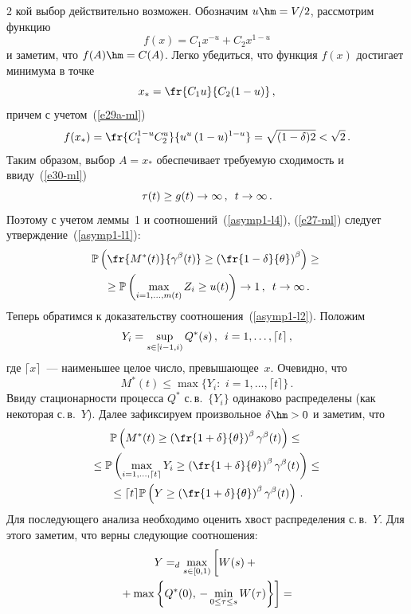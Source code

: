 \begin{multicols}{2}
\noindent
кой выбор  действительно возможен. Обозначим
$u\hm=V/2$, рассмотрим функцию
\begin{equation*}
f(x)=C_1 x^{-u}+C_2 x^{1-u} %
\end{equation*}
и заметим, что $f(A)\hm=C(A)$. Легко убедиться, что функция $f(x)$
достигает минимума в точке
$$
x_*=\fr{C_1 u}{C_2(1-u)}\,,
$$
причем с учетом~(\ref{e29a-ml})
$$
f(x_*)=\fr{C_1^{1-u}C_2^u}{u^u\,(1-u)^{1-u}}=\sqrt{(1-\delta)2}<\sqrt{2}\,.
$$
Таким образом, выбор $A=x_*$ обеспечивает требуемую сходимость и
 ввиду~(\ref{e30-ml})
$$
\tau(t)\ge g(t) \to \infty\,,\enskip t \to \infty\,.
$$
Поэтому с учетом леммы~1 и соотношений~(\ref{asymp1-l4}), (\ref{e27-ml}) следует 
утверждение~(\ref{asymp1-l1}):
\begin{multline*}
\mathbb{P}\left(\fr{M^*(t)}{\gamma^\beta(t)} \geq
 \left(
\fr{1-\delta}{\theta} \right)^\beta \right)\geq{}\\
{}\geq \mathbb{P}\left(
\max\limits_{i=1,\ldots,m(t)}Z_i \geq u(t) \right) \to 1\,,\enskip t \to \infty\,.
\end{multline*}
Теперь обратимся к доказательству соотношения~(\ref{asymp1-l2}).
Положим
$$
Y_i=\sup\limits_{s \in [i-1,i)} Q^*(s)\,,\enskip i=1,\ldots,\lceil t \rceil\,,
$$
где $\lceil x \rceil$~--- наименьшее целое число, превы\-ша\-ющее~$x$.
Очевидно, что
$$
M^*(t) \leq \max\{Y_i:\,\,i=1,\ldots,\lceil t \rceil\}\,.
$$
Ввиду  стационарности  процесса $Q^*$ с.\,в.\ $\{Y_i\}$ одинаково
распределены (как некоторая с.\,в.~$Y$).  Далее зафиксируем
произвольное $\delta\hm>0$ и заметим, что
\begin{multline}
\mathbb{P} \left( M^*(t) \geq \left(\fr{1+\delta}{\theta}\right)^\beta
\gamma^\beta(t) \right) \leq{}\\
{}\leq \mathbb{P} \left( \max_{i=1,\ldots,\lceil t \rceil} Y_i \geq 
\left(\fr{1+\delta}{\theta}\right)^\beta
\gamma^\beta(t)  \right)\leq{}\\
{}\leq \lceil t \rceil \mathbb{P} \left(Y \geq \left(\fr{1+\delta}{\theta}\right)^\beta 
\gamma^\beta(t) \right)\,. 
\label{asymp1-l6}
\end{multline}
Для последующего анализа необходимо оценить хвост распределения
с.\,в.~$Y$. Для этого заметим, что верны следующие соотношения:
\begin{multline*}
Y =_d\max\limits_{s \in [0,1)} \left[ \vphantom{\max\limits_{s \in [0,1)}}
W(s)+{}\right.\\
\left.{}+\max\left\{Q^*(0),\,
-\min\limits_{0 \leq \tau \leq s}W(\tau)   \right\}\right]={}
\end{multline*}


\end{multicols}

